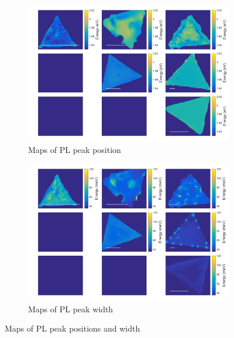 \documentclass[12pt]{article}
\begin{document}
\begin{figure}[h]
	\begin{center}
		\begin{subfigure}[b]{0.4\textwidth}
			\includegraphics[width=\textwidth]{PaperSIMapsPositionPL.png}
			\caption{Maps of PL peak position}
			\label{fig:PaperSIMapsPositionPL}
		\end{subfigure}
		\quad
		\begin{subfigure}[b]{0.4\textwidth}
			\includegraphics[width=\textwidth]{PaperSIMapsWidthPL.png}
			\caption{Maps of PL peak width}
			\label{fig:PaperSIMapsWidthPL}
		\end{subfigure}
		\caption{Maps of PL peak positions and width}
		\label{fig:PaperSIMapsPL}
	\end{center}
\end{figure}
\end{document}
